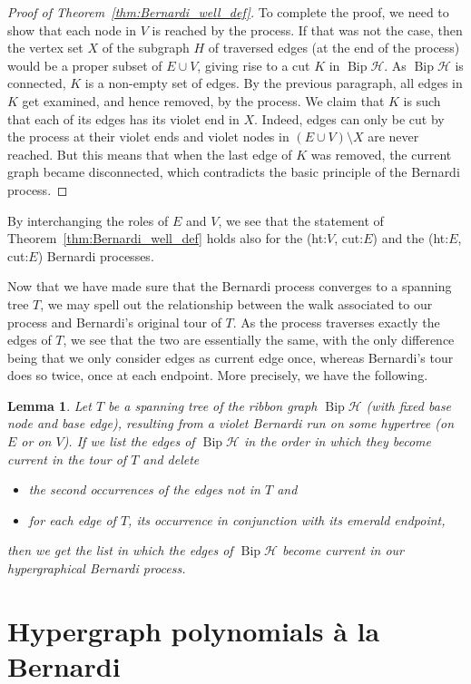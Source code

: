 \documentclass[10pt]{amsart}
\newtheorem{lemma}[theo]{Lemma}
\theoremstyle{definition}\newtheorem{defi}[theo]{Definition}
\theoremstyle{remark}\newtheorem{rema}[theo]{Remark}
\newcommand{\HH}{\mathcal H}
\DeclareMathOperator{\bip}{Bip}
\DeclareMathOperator{\Bip}{Bip}
\begin{document}
\begin{proof}[Proof of Theorem~\ref{thm:Bernardi_well_def}]
To complete the proof, we need to show that each node in $V$ is reached by the process. If that was not the case, then the vertex set $X$ of the subgraph $H$ of traversed edges (at the end of the process) would be a proper subset of $E\cup V$, giving rise to a cut $K$ in $\Bip\HH$. As $\bip\HH$ is connected, $K$ is a non-empty set of edges. By the previous paragraph, all edges in $K$ get examined, and hence removed, by the process. We claim that $K$ is such that each of its edges has its violet end in $X$. Indeed, edges can only be cut by the process at their violet ends and violet nodes in $(E\cup V)\setminus X$ are never reached. But this means that when the last edge of $K$ was removed, the current graph became disconnected, which contradicts the basic principle of the Bernardi process.
\end{proof}

By interchanging the roles of $E$ and $V$, we see that the statement of Theorem~\ref{thm:Bernardi_well_def} holds also for the (ht:$V$, cut:$E$) and the (ht:$E$, cut:$E$) Bernardi processes.

Now that we have made sure that the Bernardi process converges to a spanning tree $T$, we may spell out the relationship between the walk associated to our process and Bernardi's original tour of $T$. As the process traverses exactly the edges of $T$, we see that the two are essentially the same, with the only difference being that we only consider edges as current edge once, whereas Bernardi's tour does so twice, once at each endpoint.
More precisely, we have the following.

\begin{lemma}
\label{lem:walk_vs_tour}
Let $T$ be a spanning tree of the ribbon graph $\bip\HH$ (with fixed base node and base edge), resulting from a violet Bernardi run on some hypertree (on $E$ or on $V$). If we list the edges of $\bip\HH$ in the order in which they become current in the tour of $T$ and delete 
\begin{itemize}
\item the second occurrences of the edges not in $T$ and
\item for each edge of $T$, its occurrence in conjunction with its emerald endpoint,
\end{itemize}
then we get the list in which the edges of $\bip \HH$ become current in our hypergraphical Bernardi process. 
\end{lemma}



\section{Hypergraph polynomials \`a la Bernardi}
\label{sec:statements}
\end{document}
